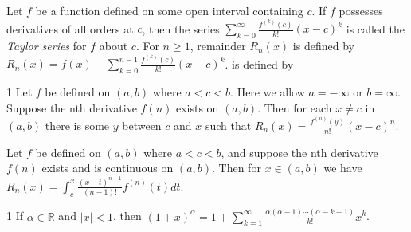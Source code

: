 \begin{defn}{1}
	Let $f$ be a function defined on some open interval containing $c$. If $f$	possesses derivatives of all orders at $c$, then the series $\sum_{k=0}^{\infty} \frac{f^(k)(c)}{k!}(x-c)^k$ is called the \textit{Taylor series} for $f$ about $c$. For $n \geq 1$, remainder $R_n (x)$ is defined by $R_n(x) = f(x) - \sum_{k=0}^{n-1} \frac{f^(k)(c)}{k!}(x-c)^k$.
	is defined by
\end{defn}

\begin{theo}{1}
	Let $f$ be defined on $(a, b)$ where $a < c < b$. Here we allow $a = -\infty$ or $b = \infty$. Suppose the nth derivative $f(n)$ exists on $(a, b)$. Then for each $x \neq c$ in $(a, b)$ there is some $y$ between $c$ and $x$ such that $R_n(x) = \frac{f^(n)(y)}{n!}(x-c)^n$.
\end{theo}

\begin{theo}{1}
	Let $f$ be defined on $(a, b)$ where $a < c < b$, and suppose the nth
	derivative $f(n)$ exists and is continuous on $(a, b)$. Then for $x \in (a, b)$ we have $R_n(x) = \int_{c}^{x} \frac{(x-t)^{n-1}}{(n-1)!}f^{(n)}(t) dt$.
\end{theo}

\begin{theo}{1}
	If $\alpha \in \mathbb{R}$ and $|x| < 1$, then $(1+x)^\alpha = 1+\sum_{k=1}^{\infty} \frac{\alpha(\alpha-1)\cdots(\alpha-k+1)}{k!}x^k$.
\end{theo}


